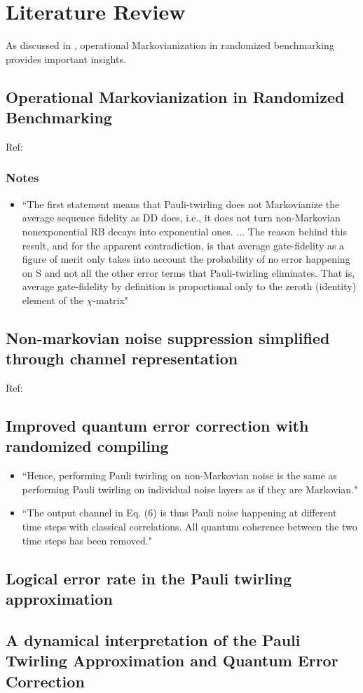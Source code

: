 \documentclass{article}
\begin{document}
\section{Literature Review}

As discussed in \cite{figueroa-romerooperational2024}, operational Markovianization in randomized benchmarking provides important insights.

\subsection{Operational Markovianization in Randomized Benchmarking}
Ref: \cite{figueroa-romerooperational2024}
\subsubsection*{Notes}
\begin{itemize}
    \item ``The first statement means that Pauli-twirling does
not Markovianize the average sequence fidelity as
DD does, i.e., it does not turn non-Markovian nonexponential RB decays into exponential ones. ... The reason behind this result, and for the apparent contradiction, is that average gate-fidelity as a figure of merit only takes into
account the probability of no error happening on S
and not all the other error terms that Pauli-twirling eliminates. That is, average gate-fidelity by definition is proportional only to the zeroth (identity) element of the $\chi$-matrix"
\end{itemize}

\subsection{Non-markovian noise suppression simplified through channel representation}
Ref: \cite{liunonmarkovian2024}

\subsection{Improved quantum error correction with randomized compiling}
\begin{itemize}
    \item ``Hence, performing Pauli twirling on non-Markovian
noise is the same as performing Pauli twirling on individual noise layers as if they are Markovian."
\item ``The output
channel in Eq. (6) is thus Pauli noise happening at different time steps with classical correlations. All quantum coherence between the two time steps has been removed."
\end{itemize}

\subsection{Logical error rate in the Pauli twirling approximation
}

\subsection{A dynamical interpretation of the Pauli Twirling Approximation and Quantum Error
Correction}

\printbibliography
\end{document}
